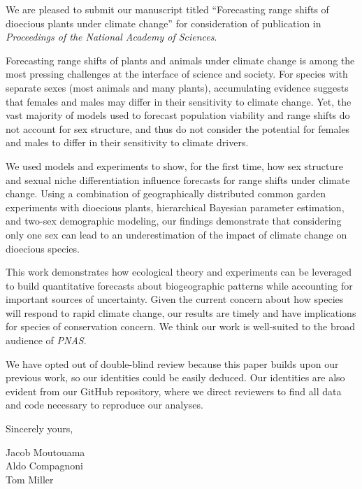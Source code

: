 \documentclass{article}
\begin{document}
We are pleased to submit our manuscript titled “Forecasting range shifts of dioecious plants under climate change” for consideration of publication in  \textit{
Proceedings of the National Academy of Sciences}.

Forecasting range shifts of plants and animals under climate change is among the most pressing challenges at the interface of science and society. 
For species with separate sexes (most animals and many plants), accumulating evidence suggests that females and males may differ in their sensitivity to climate change. 
Yet, the vast majority of models used to forecast population viability and range shifts do not account for sex structure, and thus do not consider the potential for females and males to differ in their sensitivity to climate drivers.

We used models and experiments to show, for the first time, how sex structure and sexual niche differentiation influence forecasts for range shifts under climate change. 
Using a combination of geographically distributed common garden experiments with dioecious plants, hierarchical Bayesian parameter estimation, and two-sex demographic modeling, our findings demonstrate that considering only one sex can lead to an underestimation of the impact of climate change on dioecious species.

This work demonstrates how ecological theory and experiments can be leveraged to build quantitative forecasts about biogeographic patterns while accounting for important sources of uncertainty. 
Given the current concern about how species will respond to rapid climate change, our results are timely and have implications for species of conservation concern.
We think our work is well-suited to the broad audience of \textit{PNAS}.

We have opted out of double-blind review because this paper builds upon our previous work, so our identities could be easily deduced. Our identities are also evident from our GitHub repository, where we direct reviewers to find all data and code necessary to reproduce our analyses.

\bigskip %

Sincerely yours,

\vspace{20pt} %


Jacob Moutouama \\
Aldo Compagnoni \\
Tom Miller
\end{document}
